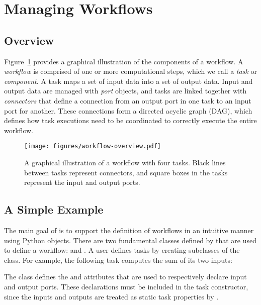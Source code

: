 
\section{Managing Workflows}

\label{chap:pw}

\subsection{Overview}

Figure~\ref{fig:overview} provides a graphical illustration of the
components of a workflow.  A \textit{workflow} is comprised of one or more
computational steps, which we call a \textit{task} or \textit{component}.
A task maps a set of input data into a set of output data.  Input and
output data are managed with \textit{port} objects, and tasks are linked
together with \textit{connectors} that define a connection from an output
port in one task to an input port for another.  These connections form
a directed acyclic graph (DAG), which defines how task executions need
to be coordinated to correctly execute the entire workflow.

\begin{figure}[htb]
  \center
  \texttt{[image: figures/workflow-overview.pdf]}
  \caption{A graphical illustration of a workflow with four tasks.  Black lines
between tasks represent connectors, and square boxes in the tasks represent the
input and output ports.}
  \label{fig:overview}
\end{figure}


\subsection{A Simple Example}
\label{sec:simple}

The main goal of \pwsp is to support the definition of workflows in an
intuitive manner using Python objects.  There are two fundamental classes defined
by \pwsp that are used to define a workflow:  and .  
A user defines tasks by creating subclasses of the  class.  For example,
the following task computes the sum of its two inputs:

The  class defines the  and 
attributes that are used to respectively declare input and output ports.
These declarations must be included in the task constructor, since the
inputs and outputs are treated as static task properties by \pw.

